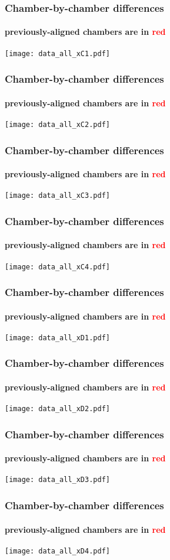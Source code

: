\documentclass[compress]{beamer}
\begin{document}
\begin{frame}
\frametitle{Chamber-by-chamber differences}
\framesubtitle{previously-aligned chambers are in \textcolor{red}{red}}
\texttt{[image: data\_all\_xC1.pdf]}
\end{frame}

\begin{frame}
\frametitle{Chamber-by-chamber differences}
\framesubtitle{previously-aligned chambers are in \textcolor{red}{red}}
\texttt{[image: data\_all\_xC2.pdf]}
\end{frame}

\begin{frame}
\frametitle{Chamber-by-chamber differences}
\framesubtitle{previously-aligned chambers are in \textcolor{red}{red}}
\texttt{[image: data\_all\_xC3.pdf]}
\end{frame}

\begin{frame}
\frametitle{Chamber-by-chamber differences}
\framesubtitle{previously-aligned chambers are in \textcolor{red}{red}}
\texttt{[image: data\_all\_xC4.pdf]}
\end{frame}

\begin{frame}
\frametitle{Chamber-by-chamber differences}
\framesubtitle{previously-aligned chambers are in \textcolor{red}{red}}
\texttt{[image: data\_all\_xD1.pdf]}
\end{frame}

\begin{frame}
\frametitle{Chamber-by-chamber differences}
\framesubtitle{previously-aligned chambers are in \textcolor{red}{red}}
\texttt{[image: data\_all\_xD2.pdf]}
\end{frame}

\begin{frame}
\frametitle{Chamber-by-chamber differences}
\framesubtitle{previously-aligned chambers are in \textcolor{red}{red}}
\texttt{[image: data\_all\_xD3.pdf]}
\end{frame}

\begin{frame}
\frametitle{Chamber-by-chamber differences}
\framesubtitle{previously-aligned chambers are in \textcolor{red}{red}}
\texttt{[image: data\_all\_xD4.pdf]}
\end{frame}
\end{document}
